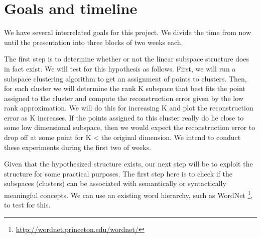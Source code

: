 \section{Goals and timeline}\label{sec:timeline}

We have several interrelated goals for this project. 
We divide the time from now until the presentation into three blocks of two weeks each.
 
The first step is to determine whether or not the linear subspace structure does in fact exist. 
We will test for this hypothesis as follows. 
 First, we will run a subspace clustering algorithm to get an assignment of points to clusters. 
Then, for each cluster we will determine the rank K subspace that best fits the point assigned to the cluster and compute the reconstruction error given by the low rank approximation. 
We will do this for increasing K and plot the reconstruction error as K increases. 
If the points assigned to this cluster really do lie close to some low dimensional subspace, then we would expect the reconstruction error to drop off at some point for K < the original dimension. 
We intend to conduct these experiments during the first two of weeks.
 
	Given that the hypothesized structure exists, our next step will be to exploit the structure for some practical purposes. 
The first step here is to check if the subspaces (clusters) can be associated with semantically or syntactically meaningful concepts. 
We can use an existing word hierarchy, such as WordNet \footnote{\url{http://wordnet.princeton.edu/wordnet/}}, to test for this. 
 
